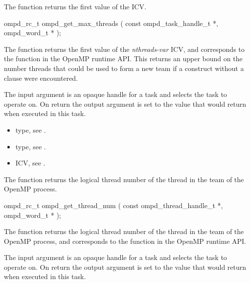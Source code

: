 \label{ompd:ompd_get_max_threads}
\summary
The  function returns the first value of the  ICV.

\format
\cspecificstart
\begin{ompSyntax}
ompd_rc_t ompd_get_max_threads (
  const ompd_task_handle_t *,
  ompd_word_t *
);
\end{ompSyntax}
\cspecificend

\descr
The  function returns the first value of the
 \emph{nthreads-var} ICV,
and corresponds to the  function
in the OpenMP runtime API.
This returns an upper bound on the number threads that could be used
to form a new team if a  construct without a
 clause were encountered.

\argdesc
The input argument  is an opaque handle for a task and selects the task to operate on.
On return the output argument  is set to the value that  would return when
executed in this task.

\crossreferences
\begin{itemize}
	\item {} type, see .
	\item {} type, see .
	\item {} ICV, see .
\end{itemize}

\label{ompd:ompd_get_thread_num}
\summary
The  function returns the logical thread number of the thread in the team of the OpenMP process.

\format
\cspecificstart
\begin{ompSyntax}
ompd_rc_t ompd_get_thread_num (
  const ompd_thread_handle_t *,
  ompd_word_t *
);
\end{ompSyntax}
\cspecificend

\descr
The  function returns the logical thread number of the thread in the team of the OpenMP process, and
corresponds to the  function in the OpenMP runtime API.


\argdesc
The input argument  is an opaque handle for a task and selects the task to operate on.
On return the output argument  is set to the value that  would return when
executed in this task.

